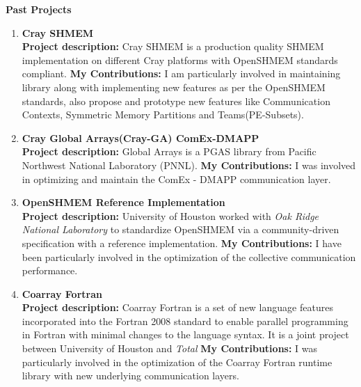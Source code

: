 \textbf{Past Projects}
\begin{enumerate}
\setcounter{enumi}{0}
\item \textbf{Cray SHMEM}\\
    \textbf{Project description:} Cray SHMEM is a production quality SHMEM
    implementation on different Cray platforms with OpenSHMEM standards
    compliant. \textbf{My Contributions:} I am particularly involved in
    maintaining library along with implementing new features as per the
    OpenSHMEM standards, also propose and prototype new features like
    Communication Contexts, Symmetric Memory Partitions and Teams(PE-Subsets).

\item \textbf{Cray Global Arrays(Cray-GA) ComEx-DMAPP}\\
    \textbf{Project description:} Global Arrays is a PGAS library from Pacific
    Northwest National Laboratory (PNNL). \textbf{My Contributions:} I was
    involved in optimizing and maintain the ComEx - DMAPP communication layer.

\item \textbf{OpenSHMEM Reference Implementation}\\
    \textbf{Project description:} University of Houston worked with \textit{Oak
    Ridge National Laboratory} to standardize OpenSHMEM via a community-driven
    specification with a reference implementation. \textbf{My Contributions:}
    I have been particularly involved in the optimization of the collective
    communication performance.

\item \textbf{Coarray Fortran}\\
    \textbf{Project description:} Coarray Fortran is a set of new language
    features incorporated into the Fortran 2008 standard to enable parallel
    programming in Fortran with minimal changes to the language syntax. It is a
    joint project between University of Houston and \textit{Total}
    \textbf{My Contributions:} I was particularly involved in the optimization
    of the Coarray Fortran runtime library with new underlying communication
    layers.
\end{enumerate}
